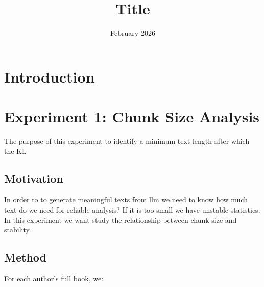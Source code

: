 \documentclass{article}
\title{Title}
\date{February 2026}
\begin{document}
\maketitle

\section{Introduction}

\section{Experiment 1: Chunk Size Analysis}

The purpose of this experiment to identify a minimum text length after which the KL 

\subsection{Motivation}

In order to to generate meaningful texts from llm we need to know how much text do we need for reliable analysis? If it is too small  we have unstable statistics. In this experiment we want study the relationship between chunk size and  stability.

\subsection{Method}

For each author's full book, we:
\end{document}
